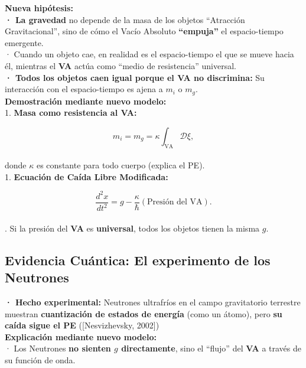 \documentclass[a4paper]{article}
\theoremstyle{definition}
\theoremstyle{remark}
\numberwithin{equation}{section}
\begin{document}
	\textbf{Nueva hipótesis:}\\
	
	\textbf{· La gravedad} no depende de la masa de los objetos ``Atracción Gravitacional'', sino de cómo el Vacío Absoluto \textbf{``empuja''} el espacio-tiempo emergente.\\
	
	· Cuando un objeto cae, en realidad es el espacio-tiempo el que se mueve hacia él, mientras el \textbf{VA} actúa como ``medio de resistencia'' universal.\\
	
	\textbf{· Todos los objetos caen igual porque el VA no discrimina:} Su interacción con el espacio-tiempo es ajena a \(m_i\) o \(m_g\).\\
	
	\textbf{Demostración mediante nuevo modelo:}\\
	
	1. \textbf{Masa como resistencia al VA:}
	
	\[
	m_i = m_g = \kappa \int_{\text{VA}} \mathcal{D}\xi,
	\]\\
	
	donde \(\kappa\) es constante para todo cuerpo (explica el PE).\\
	
	
	1. \textbf{Ecuación de Caída Libre Modificada:}
	
	\[
	\frac{d^2 x}{dt^2} = g - \frac{\kappa}{\hbar} \left(\text{Presión del VA} \right).
	\]\\
	
	. Si la presión del \textbf{VA} es \textbf{universal}, todos los objetos tienen la misma \(g\).
	
	
	\subsection{Evidencia Cuántica: El experimento de los Neutrones}
	
	\textbf{· Hecho experimental:} Neutrones ultrafríos en el campo gravitatorio terrestre muestran \textbf{cuantización de estados de energía} (como un átomo), pero \textbf{su caída sigue el PE} ([Nesvizhevsky, 2002])\\
	
	\textbf{Explicación mediante nuevo modelo:}\\
	
	· Los Neutrones \textbf{no sienten \(g\) directamente}, sino el ``flujo'' del \textbf{VA} a través de su función de onda.\\
	
\end{document}

